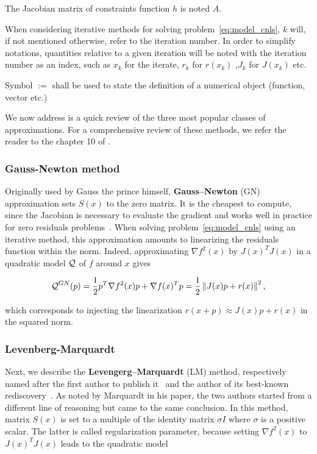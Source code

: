 \documentclass[10pt]{article}
\numberwithin{equation}{section}
\begin{document}
	 The Jacobian matrix of constraints function $h$ is noted $A$.
	 
	 When considering iterative methods for solving problem~\eqref{eq:model_cnls}, $k$ will, if not mentioned otherwise, refer to the iteration number. In order to simplify notations, quantities relative to a given iteration will be noted with the iteration number as an index, such as $x_k$ for the iterate, $r_k$ for $r(x_k)$ ,$J_k$ for $J(x_k)$ etc.
	 
	 Symbol $:=$ shall be used to state the definition of a numerical object (function, vector etc.)
	 
	 We now address is a quick review of the three most popular classes of approximations. For a comprehensive review of these methods, we refer the reader to the chapter 10 of \cite{dennisschnabel:1996}.
	 
	 \subsubsection{Gauss-Newton method}
	 
	 Originally used by Gauss the prince himself, \textbf{Gauss--Newton} (GN) approximation sets $S(x)$ to the zero matrix. It is the cheapest to compute, since the Jacobian is necessary to evaluate the gradient and works well in practice for zero residuals problems~\cite{dennisschnabel:1996}. When solving problem~\eqref{eq:model_cnls} using an iterative method, this approximation amounts to linearizing the residuals function within the norm. Indeed, approximating $\nabla f^2(x)$ by $J(x)^TJ(x)$ in a quadratic model ${\mathcal{Q}}$ of $f$ around $x$ gives
	 
	 \begin{equation}\label{eq:gn_model}
	 	{\mathcal{Q}}^{GN} (p) = \dfrac{1}{2}p^T\nabla f^2(x)p + \nabla f(x)^Tp =  \dfrac{1}{2} \left\Vert J(x)p+r(x) \right\Vert^2,
	 \end{equation}
	 
	 which corresponds to injecting the linearization $r(x+p) \approx J(x)p+r(x)$ in the squared norm.
	 
	 \subsubsection{Levenberg-Marquardt}
	 
	 Next, we describe the \textbf{Levengerg--Marquardt} (LM) method, respectively named after the first author to publish it~\cite{levenberg:1944} and the author of its best-known rediscovery~\cite{marquardt:1963}. As noted by Marquardt in his paper, the two authors started from a different line of reasoning but came to the same conclusion. In this method, matrix $S(x)$ is set to a multiple of the identity matrix $\sigma I$ where $\sigma$ is a positive scalar. The latter is called regularization parameter, because setting  $\nabla f^2(x)$ to $J(x)^TJ(x)$ leads to the quadratic model 
	 
\end{document}
